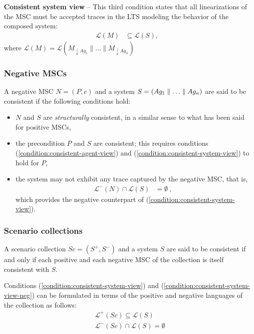 \noindent \textbf{Consistent system view} -- This third condition states that all linearizations of the MSC must be accepted traces in the LTS modeling the behavior of the composed system:
\begin{align}\mathcal{L}(M) & \subseteq \mathcal{L}(S)\label{condition:consistent-system-view},\end{align}
where $\mathcal{L}(M) = \mathcal{L}(M_{\downarrow Ag_1} \parallel \ldots \parallel M_{\downarrow Ag_n})$

\subsubsection*{Negative MSCs}

A negative MSC $N = (P,e)$ and a system $S = (Ag_1 \parallel \ldots \parallel Ag_n)$ are said to be consistent if the following conditions hold:

\begin{itemize}
\item $N$ and $S$ are \emph{structurally} consistent, in a similar sense to what has been said for positive MSCs,

\item the precondition $P$ and $S$ are consistent; this requires conditions (\ref{condition:consistent-agent-view}) and (\ref{condition:consistent-system-view}) to hold for $P$,

\item the system may not exhibit any trace captured by the negative MSC, that is,
\begin{align}\mathcal{L}^{-}(N) \cap \mathcal{L}(S) &= \emptyset~,\label{condition:consistent-system-view-neg}\end{align}
which provides the negative counterpart of (\ref{condition:consistent-system-view}).
\end{itemize}

\subsubsection*{Scenario collections}

A scenario collection $Sc = (S^+,S^-)$ and a system $S$ are said to be consistent if and only if each positive and each negative MSC of the collection is itself consistent with $S$. 

Conditions (\ref{condition:consistent-system-view}) and (\ref{condition:consistent-system-view-neg}) can be formulated in terms of the positive and negative languages of the collection as follows:
\begin{align}
&\mathcal{L}^+(Sc) \subseteq \mathcal{L}(S) \\
&\mathcal{L}^-(Sc) \cap \mathcal{L}(S) = \emptyset
\end{align}

